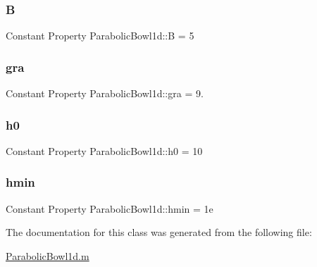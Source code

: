 \mbox{\label{class_parabolic_bowl1d_a46c8ee4b372cc4f93820303a7a6346c0}} 
\subsubsection{\texorpdfstring{B}{B}}
{\footnotesize\ttfamily Constant Property Parabolic\+Bowl1d\+::B = 5}

\mbox{\label{class_parabolic_bowl1d_a152bf3a1a100e0a075fecdf43ce533e5}} 
\subsubsection{\texorpdfstring{gra}{gra}}
{\footnotesize\ttfamily Constant Property Parabolic\+Bowl1d\+::gra = 9.}

\mbox{\label{class_parabolic_bowl1d_a74bb8fa6705ab95ac310c343635bb023}} 
\subsubsection{\texorpdfstring{h0}{h0}}
{\footnotesize\ttfamily Constant Property Parabolic\+Bowl1d\+::h0 = 10}

\mbox{\label{class_parabolic_bowl1d_a9d2851339a4d54f816c9e3f93b5c2f70}} 
\subsubsection{\texorpdfstring{hmin}{hmin}}
{\footnotesize\ttfamily Constant Property Parabolic\+Bowl1d\+::hmin = 1e}



The documentation for this class was generated from the following file\+:\begin{DoxyCompactItemize}
\item 
\hyperlink{_parabolic_bowl1d_8m}{Parabolic\+Bowl1d.\+m}\end{DoxyCompactItemize}
